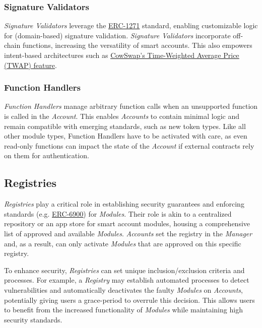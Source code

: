 \documentclass[
]{article}
\begin{document}
\hypertarget{signature-validators}{%
  \subsubsection{Signature Validators}\label{signature-validators}}

\emph{Signature Validators} leverage the \href{https://eips.ethereum.org/EIPS/eip-1271}{\uline{ERC-1271}} standard, enabling customizable logic for (domain-based) signature validation. \emph{Signature Validators} incorporate off-chain functions, increasing the versatility of smart accounts. This also empowers intent-based architectures such as \href{https://github.com/rndlabs/cowswap-twap-orders}{\uline{CowSwap's Time-Weighted Average Price (TWAP) feature}}.

\hypertarget{function-handlers}{%
  \subsubsection{Function Handlers}\label{function-handlers}}

\emph{Function Handlers} manage arbitrary function calls when an unsupported function is called in the \emph{Account}. This enables \emph{Accounts} to contain minimal logic and remain compatible with emerging standards, such as new token types. Like all other module types, Function Handlers have to be activated with care, as even read-only functions can impact the state of the \emph{Account} if external contracts rely on them for authentication.

\hypertarget{registries}{%
  \subsection{Registries}\label{registries}}

\emph{Registries} play a critical role in establishing security guarantees and enforcing standards (e.g. \href{https://eips.ethereum.org/EIPS/eip-6900}{\uline{ERC-6900}}) for \emph{Modules}. Their role is akin to a centralized repository or an app store for smart account modules, housing a comprehensive list of approved and available \emph{Modules}. \emph{Accounts} set the registry in the \emph{Manager} and, as a result, can only activate \emph{Modules} that are approved on this specific registry.

To enhance security, \emph{Registries} can set unique inclusion/exclusion criteria and processes. For example, a \emph{Registry} may establish automated processes to detect vulnerabilities and automatically deactivates the faulty \emph{Modules} on \emph{Accounts}, potentially giving users a grace-period to overrule this decision. This allows users to benefit from the increased functionality of \emph{Modules} while maintaining high security standards.
\end{document}
